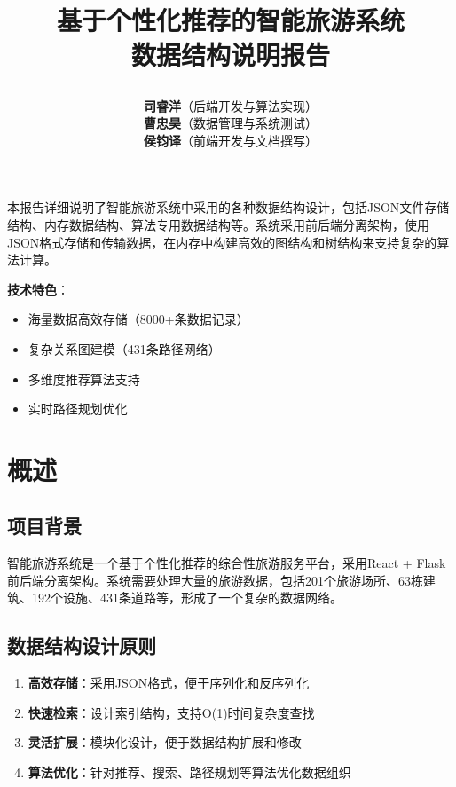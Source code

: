 \documentclass[12pt,a4paper]{article}
\title{
    \vspace{-2cm}
    \begin{tcolorbox}[
        colback=primary,
        coltext=white,
        halign=center,
        rounded corners=10pt,
        drop shadow
    ]
    \huge\textbf{基于个性化推荐的智能旅游系统}\\[0.5cm]
    \Large\textbf{数据结构说明报告}
    \end{tcolorbox}
    \vspace{1cm}
}
\author{
    \begin{tcolorbox}[
        colback=light,
        colframe=secondary,
        halign=center,
        rounded corners=5pt,
        width=0.8\textwidth
    ]
    \large
    \textbf{司睿洋}（后端开发与算法实现）\\[0.3cm]
    \textbf{曹忠昊}（数据管理与系统测试）\\[0.3cm]
    \textbf{侯钧译}（前端开发与文档撰写）
    \end{tcolorbox}
}
\date{
    \begin{tcolorbox}[
        colback=secondary!20,
        colframe=secondary,
        halign=center,
        rounded corners=5pt,
        width=0.5\textwidth
    ]
    \large\today
    \end{tcolorbox}
}
\begin{document}
\thispagestyle{empty}
\maketitle

\vfill

\begin{center}
\begin{tcolorbox}[
    colback=accent!20,
    colframe=accent,
    title={\textbf{项目概述}},
    coltitle=dark,
    colbacktitle=accent,
    fonttitle=\bfseries,
    rounded corners=8pt,
    width=0.9\textwidth
]
本报告详细说明了智能旅游系统中采用的各种数据结构设计，包括JSON文件存储结构、内存数据结构、算法专用数据结构等。系统采用前后端分离架构，使用JSON格式存储和传输数据，在内存中构建高效的图结构和树结构来支持复杂的算法计算。

\textbf{技术特色}：
\begin{itemize}[nosep]
    \item 海量数据高效存储（8000+条数据记录）
    \item 复杂关系图建模（431条路径网络）
    \item 多维度推荐算法支持
    \item 实时路径规划优化
\end{itemize}
\end{tcolorbox}
\end{center}

\newpage

\tableofcontents

\newpage

\section{概述}

\subsection{项目背景}
智能旅游系统是一个基于个性化推荐的综合性旅游服务平台，采用React + Flask前后端分离架构。系统需要处理大量的旅游数据，包括201个旅游场所、63栋建筑、192个设施、431条道路等，形成了一个复杂的数据网络。

\subsection{数据结构设计原则}
\begin{enumerate}
    \item \textbf{高效存储}：采用JSON格式，便于序列化和反序列化
    \item \textbf{快速检索}：设计索引结构，支持O(1)时间复杂度查找
    \item \textbf{灵活扩展}：模块化设计，便于数据结构扩展和修改
    \item \textbf{算法优化}：针对推荐、搜索、路径规划等算法优化数据组织
\end{enumerate}
\end{document}

